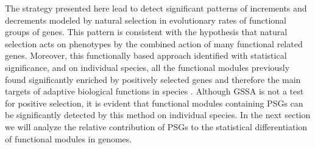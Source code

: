 The strategy presented here lead to detect significant patterns of increments and decrements modeled by natural selection in evolutionary rates of functional groups of genes. This pattern is consistent with the hypothesis that natural selection acts on phenotypes by the combined action of many functional related genes. Moreover, this functionally based approach identified with statistical significance, and on individual species, all the functional modules previously found significantly enriched by positively selected genes and therefore the main targets of adaptive biological functions in species . Although GSSA is not a test for positive selection, it is evident that functional modules containing PSGs can be significantly detected by this method on individual species. In the next section we will analyze the relative contribution of PSGs to the statistical differentiation of functional modules in genomes.



